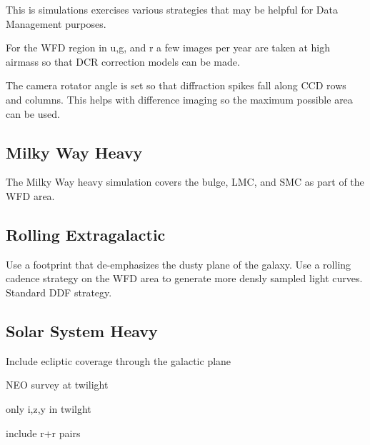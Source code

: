 This is simulations exercises various strategies that may be helpful for Data Management purposes. 

For the WFD region in u,g, and r a few images per year are taken at high airmass so that DCR correction models can be made.

The camera rotator angle is set so that diffraction spikes fall along CCD rows and columns. This helps with difference imaging so the maximum possible area can be used.

\subsection{Milky Way Heavy}

The Milky Way heavy simulation covers the bulge, LMC, and SMC as part of the WFD area.  

\subsection{Rolling Extragalactic}

Use a footprint that de-emphasizes the dusty plane of the galaxy. Use a rolling cadence strategy on the WFD area to generate more densly sampled light curves. Standard DDF strategy.

\subsection{Solar System Heavy}

Include ecliptic coverage through the galactic plane

NEO survey at twilight

only i,z,y in twilght

include r+r pairs
